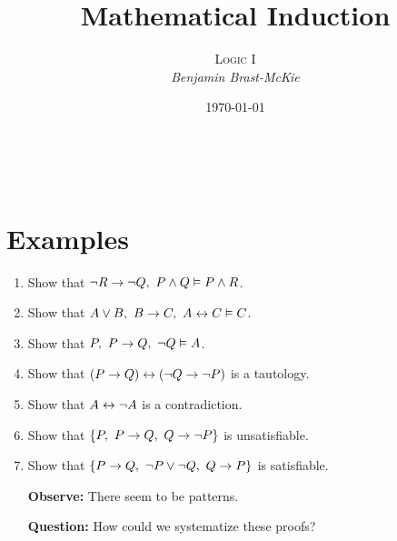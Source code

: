 \documentclass[a4paper, 11pt]{article} %
\title{\textbf{Mathematical Induction}} %
\author{\textsc{Logic I}\\ \em Benjamin Brast-McKie} %
\date{\today} %
\makeatletter
\renewcommand{\maketitle}{
\begin{flushright}
{\LARGE\@title}

\vspace{10pt}

{\@author}
\\ \@date
\end{flushright}

\vspace{-20pt}

}
\makeatother
\begin{document}
\maketitle %

\thispagestyle{empty}


\section*{Examples}

\begin{enumerate}
  \item Show that $\neg R \rightarrow \neg Q,\ P \wedge Q \vDash P \wedge R$.
  \item Show that $A \vee B,\ B \rightarrow C,\ A \leftrightarrow C \vDash C$.
  \item Show that $P,\ P \rightarrow Q,\ \neg Q \vDash A$.
  \item Show that $(P \rightarrow Q) \leftrightarrow (\neg Q \rightarrow \neg P)$ is a tautology.
  \item Show that $A \leftrightarrow \neg A$ is a contradiction.
  \item Show that $\{P,\ P \rightarrow Q,\ Q \rightarrow \neg P\}$ is unsatisfiable. 
  \item Show that $\lbrace P \rightarrow Q,\ \neg P \vee \neg Q,\ Q \rightarrow P\rbrace$ is satisfiable.
  \item[\bf Observe:] There seem to be patterns.
  \item[\bf Question:] How could we systematize these proofs?
\end{enumerate}
\end{document}
